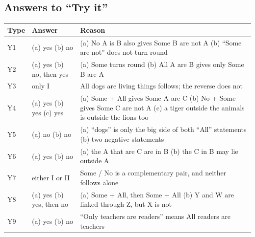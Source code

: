 \documentclass[11pt,a4paper]{article}
\let\oldsubsection\subsection
\renewcommand{\subsection}{\needspace{9\baselineskip}\oldsubsection}
\begin{document}
\subsection*{Answers to ``Try it''}
\begin{center}\small\renewcommand{\arraystretch}{1.2}\setlength{\tabcolsep}{8pt}
\begin{tabularx}{\linewidth}{@{}l>{\raggedright\arraybackslash}X>{\raggedright\arraybackslash}X@{}}
\toprule
\textbf{\color{slate}Type} & \textbf{\color{slate}Answer} & \textbf{\color{slate}Reason} \\ \midrule
Y1 & (a) yes \newline (b) no & (a) No A is B also gives Some B are not A \newline (b) ``Some are not'' does not turn round \\
Y2 & (a) yes \newline (b) no, then yes & (a) Some turns round \newline (b) All A are B gives only Some B are A \\
Y3 & only I & All dogs are living things follows; the reverse does not \\
Y4 & (a) yes \newline (b) yes \newline (c) yes & (a) Some + All gives Some A are C \newline (b) No + Some gives Some C are not A \newline (c) a tiger outside the animals is outside the lions too \\
Y5 & (a) no \newline (b) no & (a) ``dogs'' is only the big side of both ``All'' statements \newline (b) two negative statements \\
Y6 & (a) yes \newline (b) no & (a) the A that are C are in B \newline (b) the C in B may lie outside A \\
Y7 & either I or II & Some / No is a complementary pair, and neither follows alone \\
Y8 & (a) yes \newline (b) yes, then no & (a) Some + All, then Some + All \newline (b) Y and W are linked through Z, but X is not \\
Y9 & (a) yes \newline (b) no & ``Only teachers are readers'' means All readers are teachers \\

\end{tabularx}
\end{center}
\end{document}
